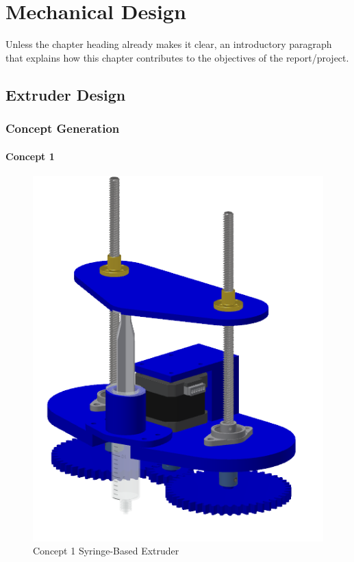 \chapter{Mechanical Design}

Unless the chapter heading already makes it clear, an introductory paragraph that explains how this chapter contributes to the objectives of the report/project.

\section{Extruder Design}
\subsection{Concept Generation}
\subsubsection*{Concept 1}
\begin{figure}[H]
    \centering
    \includegraphics[scale=1]{figs/SyringeConcept1.png}
    \caption{Concept 1 Syringe-Based Extruder}
    \label{fig:extruderConcept1}
\end{figure}
